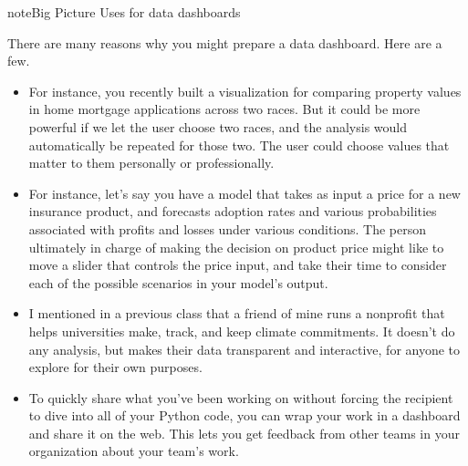 \documentclass[letterpaper,10pt,english]{jupyterBook}
\begin{document}
\begin{sphinxadmonition}{note}{Big Picture \sphinxhyphen{} Uses for data dashboards}

\sphinxAtStartPar
There are many reasons why you might prepare a data dashboard.  Here are a few.
\begin{itemize}
\item {} 
\sphinxAtStartPar
{}  For instance, you recently built a visualization for comparing property values in home mortgage applications across two races.  But it could be more powerful if we let the user choose two races, and the analysis would automatically be repeated for those two.  The user could choose values that matter to them personally or professionally.

\item {} 
\sphinxAtStartPar
{}  For instance, let’s say you have a model that takes as input a price for a new insurance product, and forecasts adoption rates and various probabilities associated with profits and losses under various conditions.  The person ultimately in charge of making the decision on product price might like to move a slider that controls the price input, and take their time to consider each of the possible scenarios in your model’s output.

\item {} 
\sphinxAtStartPar
{}  I mentioned in a previous class that a friend of mine runs a nonprofit that helps universities make, track, and keep climate commitments.    It doesn’t do any analysis, but makes their data transparent and interactive, for anyone to explore for their own purposes.

\item {} 
\sphinxAtStartPar
{}  To quickly share what you’ve been working on without forcing the recipient to dive into all of your Python code, you can wrap your work in a dashboard and share it on the web.  This lets you get feedback from other teams in your organization about your team’s work.

\end{itemize}
\end{sphinxadmonition}
\end{document}
